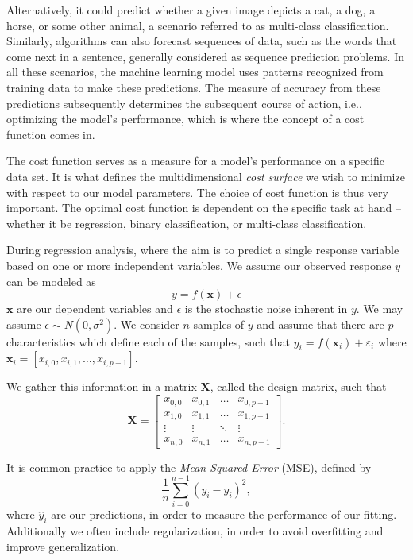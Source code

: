 \documentclass{article}
\theoremstyle{definition}
\begin{document}
Alternatively, it could predict whether a given image depicts a cat, a dog, a horse, or some other animal, a scenario referred to as multi-class classification. Similarly, algorithms can also forecast sequences of data, such as the words that come next in a sentence, generally considered as sequence prediction problems. In all these scenarios, the machine learning model uses patterns recognized from training data to make these predictions. The measure of accuracy from these predictions subsequently determines the subsequent course of action, i.e., optimizing the model's performance, which is where the concept of a cost function comes in.


The cost function serves as a measure for a model's performance on a specific data set. It is what defines the multidimensional \textit{cost surface} we wish to minimize with respect to our model parameters. The choice of cost function is thus very important. The optimal cost function is dependent on the specific task at hand – whether it be regression, binary classification, or multi-class classification.

During regression analysis, where the aim is to predict a single response variable based on one or more independent variables. We assume our observed response $y$ can be modeled as
\begin{equation*}
    y = f(\boldsymbol{x}) + \epsilon
\end{equation*}
$\mathbf{x}$ are our dependent variables and $\epsilon$ is 
the stochastic noise inherent in $y$. We may assume $\epsilon \sim N(0,\sigma^2)$.
We consider $n$ samples of $y$ and assume that there are $p$ characteristics which define each of the samples, such that $y_i = f(\boldsymbol{x}_i) + \varepsilon_i$ where $\boldsymbol{x}_i = \left[x_{i,0}, x_{i, 1}, \ldots, x_{i, p-1} \right]$.

We gather this information in a matrix $\textbf{X}$, called the design matrix, such that
\begin{equation*}
    \textbf{X} =
    \begin{bmatrix}
        x_{0,0} & x_{0,1} & \ldots & x_{0, p-1} \\
        x_{1,0} & x_{1,1} & \ldots & x_{1, p-1} \\
        \vdots & \vdots & \ddots & \vdots \\
        x_{n,0} & x_{n,1} & \ldots & x_{n, p-1}
    \end{bmatrix}.
\end{equation*}

It is common practice to apply the \textit{Mean Squared Error} (MSE), defined by
\begin{equation*}
    \frac{1}{n} \sum_{i = 0}^{n-1} (y_i - \hat{y}_i)^2,
\end{equation*}
where $\hat{y}_i$ are our predictions, in order to measure the performance of our fitting. Additionally we often include regularization, in order to avoid overfitting and improve generalization. 
\end{document}
